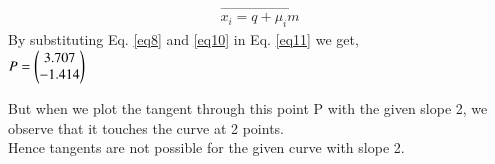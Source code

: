 \documentclass[journal,12pt,twocolumn]{IEEEtran}
\begin{document}
\begin{align}
\vec{x_i = q+\mu_im}
\label{eq11}
\end{align}
By substituting Eq. \eqref{eq8} and \eqref{eq10} in Eq. \eqref{eq11} we get,\\
\vspace{0.5cm}
\centering
$P = \begin{pmatrix}3.707\\-1.414\end{pmatrix}$\\
\vspace{1cm}
\raggedright
But when we plot the tangent through this point P with the given slope 2, we observe that it touches the curve at 2 points.\\
\vspace{0.5cm}
Hence tangents are not possible for the given curve with slope 2.\\  
\end{document}
